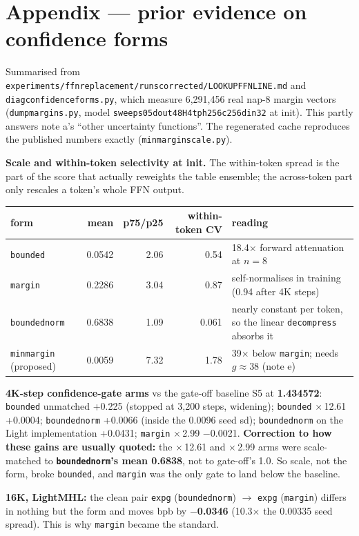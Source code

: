 \documentclass[10pt]{article}
\newcommand{\code}[1]{{\renewcommand{\_}{\textunderscore\allowbreak}\texttt{#1}}}
\begin{document}
\newpage
\section*{Appendix --- prior evidence on confidence forms}
Summarised from \code{experiments/ffn\_replacement/runs\_corrected/LOOKUPFFN\_LINE.md} and \code{diag\_confidence\_forms.py}, which measure 6,291,456 real nap-8 margin vectors
(\code{dump\_margins.py}, model \code{sweep\_s05\_dout48\_H4\_tph256\_c256\_din32} at init). This partly answers note a's ``other uncertainty functions''.
The regenerated cache reproduces the published numbers exactly (\code{min\_margin\_scale.py}).

\textbf{Scale and within-token selectivity at init.} The within-token spread is the part of the score that actually reweights the table ensemble;
the across-token part only rescales a token's whole FFN output.
\begin{center}\small
\begin{tabular}{lrrrl}
\toprule
form & mean & p75/p25 & within-token CV & reading \\
\midrule
\code{bounded} & 0.0542 & 2.06 & 0.54 & 18.4$\times$ forward attenuation at $n=8$ \\
\code{margin} & 0.2286 & 3.04 & 0.87 & self-normalises in training (0.94 after 4K steps) \\
\code{bounded\_norm} & 0.6838 & 1.09 & 0.061 & nearly constant per token, so the linear \code{decompress} absorbs it \\
\code{min\_margin} (proposed) & 0.0059 & 7.32 & 1.78 & 39$\times$ below \code{margin}; needs $g\approx38$ (note e) \\
\bottomrule
\end{tabular}
\end{center}

\textbf{4K-step confidence-gate arms} vs the gate-off baseline S5 at \textbf{1.434572}:
\code{bounded} unmatched +0.225 (stopped at 3,200 steps, widening); \code{bounded} $\times$\,12.61 +0.0004; \code{bounded\_norm} +0.0066 (inside the 0.0096 seed sd);
\code{bounded\_norm} on the Light implementation +0.0431; \code{margin} $\times$\,2.99 $-$0.0021.
\textbf{Correction to how these gains are usually quoted:} the $\times$\,12.61 and $\times$\,2.99 arms were scale-matched to \textbf{\code{bounded\_norm}'s mean 0.6838}, not to gate-off's 1.0.
So scale, not the form, broke \code{bounded}, and \code{margin} was the only gate to land below the baseline.

\textbf{16K, LightMHL:} the clean pair \code{exp\_g\_0189} (\code{bounded\_norm}) $\to$ \code{exp\_g\_0193} (\code{margin}) differs in nothing but the form and moves bpb by
\textbf{$-$0.0346} (10.3$\times$ the 0.00335 seed spread). This is why \code{margin} became the standard.
\end{document}
